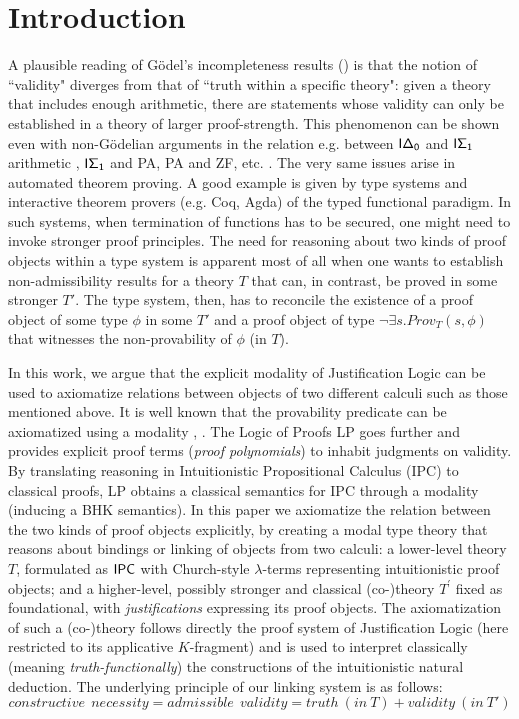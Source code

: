 \documentclass[11pt]{entcs}
\begin{document}
\section{Introduction}

A plausible reading of  G\"{o}del's incompleteness results (\cite{citeulike:713002})  is that the notion of ``validity" diverges from that of ``truth within a specific theory": given a theory that includes enough arithmetic, there are statements whose validity can only be established in a theory of larger proof-strength.  This phenomenon can be shown even with non-G\"{o}delian arguments in the relation e.g.  between ${\sf I\Delta_0}$ and ${\sf I\Sigma_1}$ arithmetic \cite{parikh:existence}, ${\sf I\Sigma_1}$ and {\sf PA}, {\sf PA} and {\sf ZF},  etc. \cite{Smith05anintroduction,Buss199879}. The very same issues arise in automated theorem proving. A good example is given by type systems and interactive theorem provers (e.g. Coq, Agda) of the typed functional paradigm. In such systems, when termination of functions has to be secured, one might need to invoke stronger proof principles. 
The need for reasoning about two kinds of proof objects within a type system is apparent most of all when one wants to establish non-admissibility results for a theory $T$ that can, in contrast, be proved in some stronger $T'$. The type system, then, has to reconcile the existence of  a proof object of some type $\phi$ in some $T'$  and a proof object of type $\neg \exists s. Prov_{T}(s,\phi)$ that witnesses the non-provability of  $\phi$ (in $T$). 

In this work, we argue that the explicit modality of Justification Logic \cite{DBLP:conf/jelia/Artemov08} can be used to axiomatize relations between objects of two different calculi such as those mentioned above.  It is well known that the provability predicate can be axiomatized using a modality \cite{citeulike:214701}, \cite{ArtBek05HPL}. The Logic of Proofs {\sf LP} \cite{Art94APAL} goes further and provides explicit proof terms (\textit{proof polynomials}) to inhabit judgments on validity. By translating reasoning in Intuitionistic Propositional Calculus ({\sf IPC}) to classical proofs, {\sf LP} obtains a classical semantics for {\sf IPC} through a modality (inducing a {\sf BHK} semantics). In this paper we axiomatize the relation between the two kinds of proof objects explicitly, by creating a modal type theory that reasons about bindings or linking of objects from two calculi: a lower-level theory $T$, formulated as ${\sf IPC}$ with Church-style $\lambda$-terms representing intuitionistic proof objects; and a higher-level, possibly stronger and classical (co-)theory $T^\prime$ fixed as foundational, with \textit{justifications} expressing its proof objects. The axiomatization of such a (co-)theory follows directly the proof system of Justification Logic (here restricted to its applicative $K$-fragment) and is used to interpret classically (meaning \textit{truth-functionally}) the constructions of the intuitionistic natural deduction. The underlying principle of our linking system is as follows: $$constructive\ \  necessity= admissible \ \ validity = truth\  (in\  T) + validity\  (in\  T')$$ 
\end{document}
